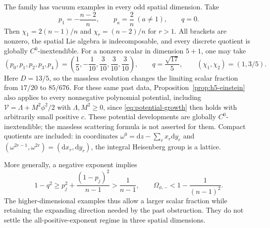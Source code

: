 \documentclass[10pt,a4paper]{article}
\numberwithin{equation}{section}
\theoremstyle{definition}
\theoremstyle{remark}
\newcommand{\dd}{\mathrm d}
\begin{document}
The family has vacuum examples in every odd spatial dimension.  Take
\[
 p_1=-\frac{n-2}{n},\qquad p_a=\frac2n\ (a\ne1),\qquad q=0.
\]
Then $\chi_1=2(n-1)/n$ and $\chi_r=(n-2)/n$ for $r>1$.
All brackets are nonzero, the spatial Lie algebra is indecomposable,
and every discrete quotient is globally $C^0$-inextendible.
For a nonzero scalar in dimension $5+1$, one may take
\begin{equation}
 (p_0,p_1,p_2,p_3,p_4)=
 \left(\frac15,-\frac1{10},\frac3{10},\frac3{10},\frac3{10}\right),
 \qquad q=\frac{\sqrt{17}}5,
 \qquad (\chi_1,\chi_2)=(1,3/5).
 \label{eq:h5-concrete-scalar-data}
\end{equation}
Here $D=13/5$, so the massless evolution changes the limiting scalar
fraction from $17/20$ to $85/676$.
For these same past data, Proposition~\ref{prop:h5-einstein} also applies
to every nonnegative polynomial potential, including
$\mathcal V=\Lambda+M^2\phi^2/2$ with $\Lambda,M^2\ge0$, since
\eqref{eq:potential-growth} then holds with arbitrarily small positive
$c$.  These potential developments are globally $C^0$-inextendible;
the massless scattering formula is not asserted for them.
Compact quotients are included: in coordinates
$\omega^0=\dd z-\sum_r x_r\dd y_r$ and
$(\omega^{2r-1},\omega^{2r})=(\dd x_r,\dd y_r)$, the integral
Heisenberg group is a lattice.

More generally, a negative exponent implies
\[
 1-q^2\ge p_j^2+\frac{(1-p_j)^2}{n-1}>\frac1{n-1},
 \qquad \Omega_{\phi,-}<1-\frac1{(n-1)^2}.
\]
The higher-dimensional examples thus allow a larger scalar fraction
while retaining the expanding direction needed by the past obstruction.
They do not settle the all-positive-exponent regime in three spatial
dimensions.
\end{document}
